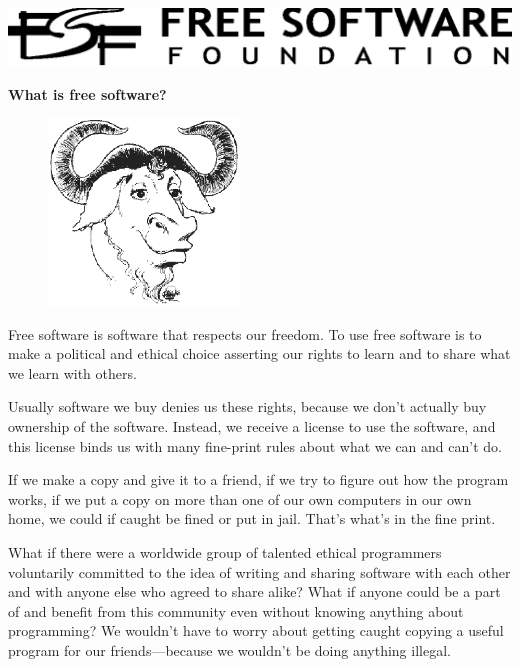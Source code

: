 \documentclass[twoside,12pt]{article}
\begin{document}
\begin{center}

\includegraphics{fsf-logo.eps}

\vspace{0.3in}

{\Huge\bf What is free software?}

\end{center}

\begin{figure}
 \begin{center}
   \includegraphics[width=2in]{gnu-head.eps}
 \end{center}
\end{figure}

Free software is software that respects our freedom. To use free software is to
make a political and ethical choice asserting our rights to learn and to share
what we learn with others.

Usually software we buy denies us these rights, because we don't actually buy
ownership of the software. Instead, we receive a license to use the software,
and this license binds us with many fine-print rules about what we can and
can't do.

If we make a copy and give it to a friend, if we try to figure out how the
program works, if we put a copy on more than one of our own computers in our
own home, we could if caught be fined or put in jail. That's what's in the fine
print.

What if there were a worldwide group of talented ethical programmers
voluntarily committed to the idea of writing and sharing software with each
other and with anyone else who agreed to share alike? What if anyone could be a
part of and benefit from this community even without knowing anything about
programming? We wouldn't have to worry about getting caught copying a useful
program for our friends---because we wouldn't be doing anything illegal.
\end{document}
